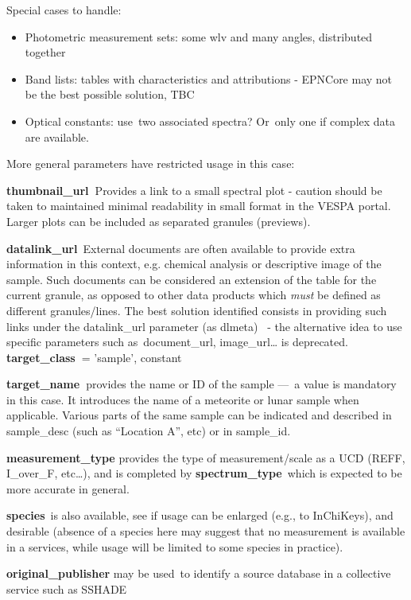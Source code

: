 \documentclass[11pt,a4paper]{ivoa}
\begin{document}
Special cases to handle:

\begin{itemize}
\item Photometric measurement sets: some wlv and many angles, distributed together
\item Band lists: tables with characteristics and attributions - EPNCore may not be the best possible solution, TBC
\item Optical constants: use two associated spectra? Or only one if complex data are available.
\end{itemize}

More general parameters have restricted usage in this case:

\textbf{thumbnail\_url }Provides a link to a small spectral plot - caution should be taken to maintained minimal readability in small format in the VESPA portal. Larger plots can be included as separated granules (previews).

\textbf{datalink\_url} External documents are often available to provide extra information in this context, e.g. chemical analysis or descriptive image of the sample. Such documents can be considered an extension of the table for the current granule, as opposed to other data products which \emph{must} be defined as different granules/lines. The best solution identified consists in providing such links under the datalink\_url parameter (as dlmeta)  - the alternative idea to use specific parameters such as document\_url, image\_url… is deprecated.\\

\textbf{target\_class }= 'sample', constant

\textbf{target\_name }provides the name or ID of the sample — a value is mandatory in this case. It introduces the name of a meteorite or lunar sample when applicable. Various parts of the same sample can be indicated and described in sample\_desc (such as ``Location A'', etc) or in sample\_id.

\textbf{measurement\_type} provides the type of measurement/scale as a UCD (REFF, I\_over\_F, etc…), and is completed by \textbf{spectrum\_type} which is expected to be more accurate in general.

\textbf{species} is also available, see if usage can be enlarged (e.g., to InChiKeys), and desirable (absence of a species here may suggest that no measurement is available in a services, while usage will be limited to some species in practice).

\textbf{original\_publisher }may be used to identify a source database in a collective service such as SSHADE
\end{document}
